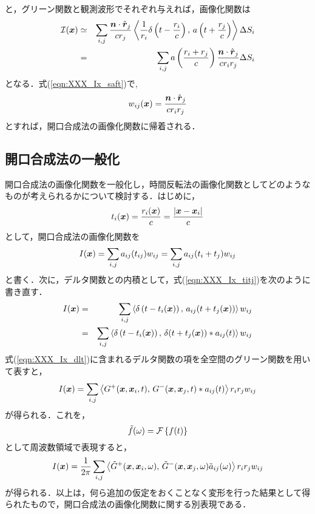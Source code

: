 と，グリーン関数と観測波形でそれぞれ与えれば，画像化関数は
\begin{eqnarray}
	{\cal I}(\mbox{\boldmath $x$})
	&\simeq & 
	\sum_{i,j}
	\frac{\mbox{\boldmath $n$}\cdot\hat{\mbox{\boldmath $r$}}_j}{cr_j}
	\left<
		\frac{1}{r_i}\delta\left( t-\frac{r_i}{c}\right)
		,\, 
		a\left(t+\frac{r_j}{c}\right)
	\right>
	\Delta S_i \\ 
	&=&
	\sum_{i,j}
	a\left(\frac{r_i+r_j}{c}\right)
	\frac{\mbox{\boldmath $n$}\cdot\hat{\mbox{\boldmath $r$}}_j}{cr_i r_j} 
	\Delta S_i 
	\label{eqn:XXX_Ix_saft}
\end{eqnarray}
となる．式(\ref{eqn:XXX_Ix_saft})で,
\begin{equation}
	w_{ij}(\mbox{\boldmath $x$})=\frac{\mbox{\boldmath $n$}\cdot\hat{\mbox{\boldmath $r$}}_j}{cr_i r_j} 
	\label{eqn:}
\end{equation}
とすれば，開口合成法の画像化関数に帰着される．
\subsection{開口合成法の一般化}
開口合成法の画像化関数を一般化し，時間反転法の画像化関数としてどのような
ものが考えられるかについて検討する．はじめに，
\begin{equation}
	t_i(\mbox{\boldmath $x$})=\frac{r_i(\mbox{\boldmath $x$})}{c}=\frac{|\mbox{\boldmath $x$}-\mbox{\boldmath $x$}_i|}{c}
	\label{eqn:}
\end{equation}
として，開口合成法の画像化関数を
\begin{equation}
	I(\mbox{\boldmath $x$})
	=\sum_{i,j} a_{ij}(t_{ij})w_{ij}
	=\sum_{i,j} a_{ij}(t_i+t_j)w_{ij}
	\label{eqn:XXX_Ix_titj}
\end{equation}
と書く．次に，デルタ関数との内積として，式(\ref{eqn:XXX_Ix_titj})を次のように書き直す．
\begin{eqnarray}
	I(\mbox{\boldmath $x$}) &=&
	\sum_{i,j} 
	\left< \delta\left(t-t_i(\mbox{\boldmath $x$})\right),\, a_{ij}(t+t_j(\mbox{\boldmath $x$})) \right> w_{ij}
	\\ 
	&=& 
	\sum_{i,j} 
	\left< \delta\left(t-t_i(\mbox{\boldmath $x$})\right),\, \delta(t+t_j(\mbox{\boldmath $x$}))*a_{ij}(t) \right>w_{ij}
	\label{eqn:XXX_Ix_dlt}
\end{eqnarray}
式(\ref{eqn:XXX_Ix_dlt})に含まれるデルタ関数の項を全空間のグリーン関数を用いて表すと，
\begin{equation}
	I(\mbox{\boldmath $x$}) =
	\sum_{i,j} 
	\left< G^+(\mbox{\boldmath $x$},\mbox{\boldmath $x$}_i,t),\, G^{-}(\mbox{\boldmath $x$},\mbox{\boldmath $x$}_j,t)*a_{ij}(t)\right>
	r_ir_jw_{ij}
	\label{eqn:}
\end{equation}
が得られる．これを，
\begin{equation}
	\tilde f(\omega) = {\cal F} \left\{ f(t)\right\}
	\label{eqn:}
\end{equation}
として周波数領域で表現すると，
\begin{equation}
	I(\mbox{\boldmath $x$}) =
	\frac{1}{2\pi}
	\sum_{i,j} 
	\left< \tilde G^+(\mbox{\boldmath $x$},\mbox{\boldmath $x$}_i,\omega),\, \tilde G^{-}(\mbox{\boldmath $x$},\mbox{\boldmath $x$}_j,\omega)\tilde a_{ij}(\omega)\right>
	r_ir_jw_{ij}
	\label{eqn:XXX_Ix_w}
\end{equation}
が得られる．以上は，何ら追加の仮定をおくことなく変形を行った結果として得られたもので，開口合成法の画像化関数に関する別表現である．

